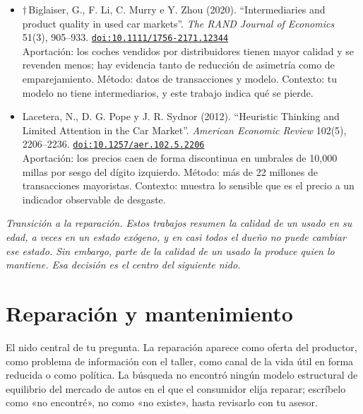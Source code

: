 \documentclass[11pt]{article}
\begin{document}
\begin{itemize}
Aportación: cuantifica la eficiencia de la negociación con información incompleta bilateral. Método: unas 265,000 negociaciones tras subastas mayoristas de autos. Contexto: fricciones del mercado real de usados, resumidas en tus costos de transacción.
\item $\dagger$\,Biglaiser, G., F. Li, C. Murry e Y. Zhou (2020). ``Intermediaries and product quality in used car markets''. \textit{The RAND Journal of Economics} 51(3), 905--933. \href{https://doi.org/10.1111/1756-2171.12344}{\texttt{doi:10.1111/1756-2171.12344}}\\
Aportación: los coches vendidos por distribuidores tienen mayor calidad y se revenden menos; hay evidencia tanto de reducción de asimetría como de emparejamiento. Método: datos de transacciones y modelo. Contexto: tu modelo no tiene intermediarios, y este trabajo indica qué se pierde.
\item Lacetera, N., D. G. Pope y J. R. Sydnor (2012). ``Heuristic Thinking and Limited Attention in the Car Market''. \textit{American Economic Review} 102(5), 2206--2236. \href{https://doi.org/10.1257/aer.102.5.2206}{\texttt{doi:10.1257/aer.102.5.2206}}\\
Aportación: los precios caen de forma discontinua en umbrales de 10,000 millas por sesgo del dígito izquierdo. Método: más de 22 millones de transacciones mayoristas. Contexto: muestra lo sensible que es el precio a un indicador observable de desgaste.
\end{itemize}

\medskip
\noindent\textit{Transición a la reparación. Estos trabajos resumen la calidad de un usado en su edad, a veces en un estado exógeno, y en casi todos el dueño no puede cambiar ese estado. Sin embargo, parte de la calidad de un usado la produce quien lo mantiene. Esa decisión es el centro del siguiente nido.}

\section{Reparación y mantenimiento}
El nido central de tu pregunta. La reparación aparece como oferta del productor, como problema de información con el taller, como canal de la vida útil en forma reducida o como política. La búsqueda no encontró ningún modelo estructural de equilibrio del mercado de autos en el que el consumidor elija reparar; escríbelo como «no encontré», no como «no existe», hasta revisarlo con tu asesor.
\end{document}
